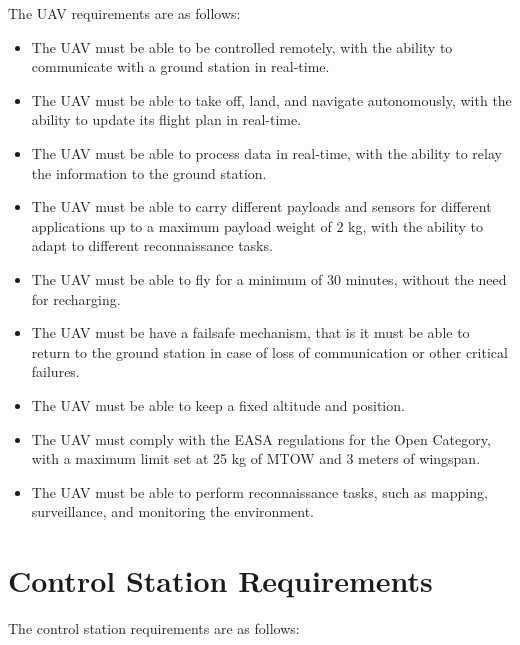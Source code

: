 The UAV requirements are as follows:

\begin{itemize}
  \item The UAV must be able to be controlled remotely, with the ability to communicate with a ground station in real-time.

  \item The UAV must be able to take off, land, and navigate autonomously, with the ability to update its flight plan in real-time.

  \item The UAV must be able to process data in real-time, with the ability to relay the information to the ground station.

  \item The UAV must be able to carry different payloads and sensors for different applications up to a maximum payload weight of 2 kg, with the ability to adapt to different reconnaissance tasks.

  \item The UAV must be able to fly for a minimum of 30 minutes, without the need for recharging.

  \item The UAV must be have a failsafe mechanism, that is it must be able to return to the ground station in case of loss of communication or other critical failures.

  \item The UAV must be able to keep a fixed altitude and position.

  \item The UAV must comply with the EASA regulations for the Open Category, with a maximum limit set at 25 kg of MTOW and 3 meters of wingspan.

  \item The UAV must be able to perform reconnaissance tasks, such as mapping, surveillance, and monitoring the environment.
\end{itemize}

\section{Control Station Requirements}

The control station requirements are as follows:

